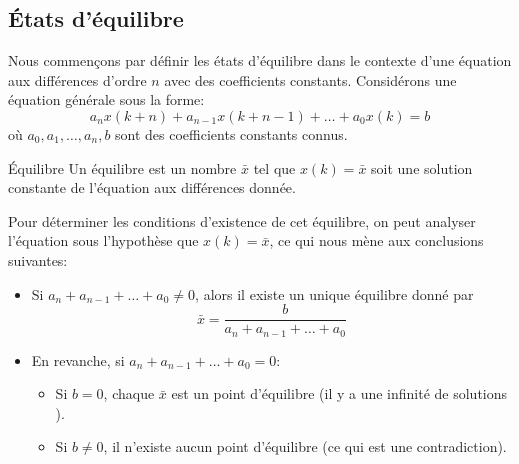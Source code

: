         \subsection{États d'équilibre}
            Nous commençons par définir les états d'équilibre dans le contexte d'une équation aux différences d'ordre $n$ avec des coefficients constants. Considérons une équation générale sous la forme:
            \begin{equation}
                a_n x(k+n)+a_{n-1} x(k+n-1)+\dots+a_0 x(k) = b
            \end{equation}
            où $a_0, a_1, \dots, a_n, b$ sont des coefficients constants connus.
            \begin{definition}{Équilibre}
                Un équilibre est un nombre $\bar{x}$ tel que $x(k) = \bar{x}$ soit une solution constante de l'équation aux différences donnée.
            \end{definition}
            Pour déterminer les conditions d'existence de cet équilibre, on peut analyser l'équation sous l'hypothèse que $x(k) = \bar{x}$, ce qui nous mène aux conclusions suivantes:
            \begin{itemize}
                \item Si $a_n+a_{n-1}+\dots+a_0 \neq 0$, alors il existe un unique équilibre donné par
                \begin{equation}
                    \bar{x} = \frac{b}{a_n+a_{n-1}+\dots+a_0}
                \end{equation}
                \item En revanche, si $a_n+a_{n-1}+\dots+a_0 = 0$:
                \begin{itemize}
                    \item Si $b = 0$, chaque $\bar{x}$ est un point d'équilibre (il y a une infinité de solutions ).
                    \item Si $b \neq 0$, il n'existe aucun point d'équilibre (ce qui est une contradiction).
                \end{itemize}
            \end{itemize}

